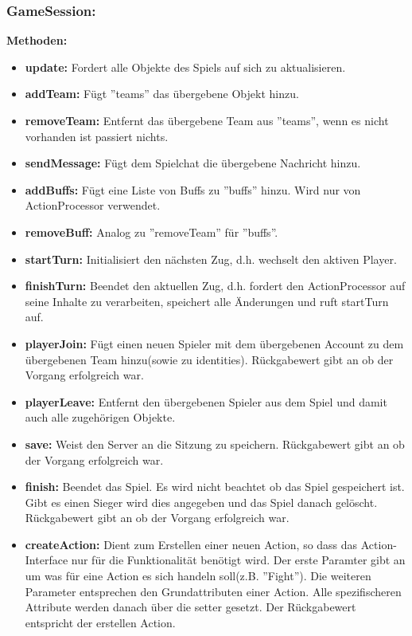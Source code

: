 \documentclass[fontsize=12pt,paper=a4,twoside]{scrartcl}
\begin{document}
\subsubsection{GameSession:}
\textbf{Methoden:}
\begin{itemize}
	\item \textbf{update:} Fordert alle Objekte des Spiels auf sich zu aktualisieren.
	\item \textbf{addTeam:} Fügt ''teams'' das übergebene Objekt hinzu.
	\item \textbf{removeTeam:} Entfernt das übergebene Team aus ''teams'', wenn es nicht vorhanden ist passiert nichts.
	\item \textbf{sendMessage:} Fügt dem Spielchat die übergebene Nachricht hinzu.
	\item \textbf{addBuffs:} Fügt eine Liste von Buffs zu ''buffs'' hinzu. Wird nur von ActionProcessor verwendet.
	\item \textbf{removeBuff:} Analog zu ''removeTeam'' für ''buffs''.
	\item \textbf{startTurn:} Initialisiert den nächsten Zug, d.h. wechselt den aktiven Player.
	\item \textbf{finishTurn:} Beendet den aktuellen Zug, d.h. fordert den ActionProcessor auf seine Inhalte zu verarbeiten, speichert alle Änderungen und ruft startTurn auf.
	\item \textbf{playerJoin:} Fügt einen neuen Spieler mit dem übergebenen Account zu dem übergebenen Team hinzu(sowie zu identities). Rückgabewert gibt an ob der Vorgang erfolgreich war.
	\item \textbf{playerLeave:} Entfernt den übergebenen Spieler aus dem Spiel und damit auch alle zugehörigen Objekte.
	\item \textbf{save:} Weist den Server an die Sitzung zu speichern. Rückgabewert gibt an ob der Vorgang erfolgreich war.
	\item \textbf{finish:} Beendet das Spiel. Es wird nicht beachtet ob das Spiel gespeichert ist. Gibt es einen Sieger wird dies angegeben und das Spiel danach gelöscht. Rückgabewert gibt an ob der Vorgang erfolgreich war.
	\item \textbf{createAction:} Dient zum Erstellen einer neuen Action, so dass das Action-Interface nur für die Funktionalität benötigt wird. Der erste Paramter gibt an um was für eine Action es sich handeln soll(z.B. ''Fight''). Die weiteren Parameter entsprechen den Grundattributen einer Action. Alle spezifischeren Attribute werden danach über die setter gesetzt. Der Rückgabewert entspricht der erstellen Action.
\end{itemize}
\end{document}
